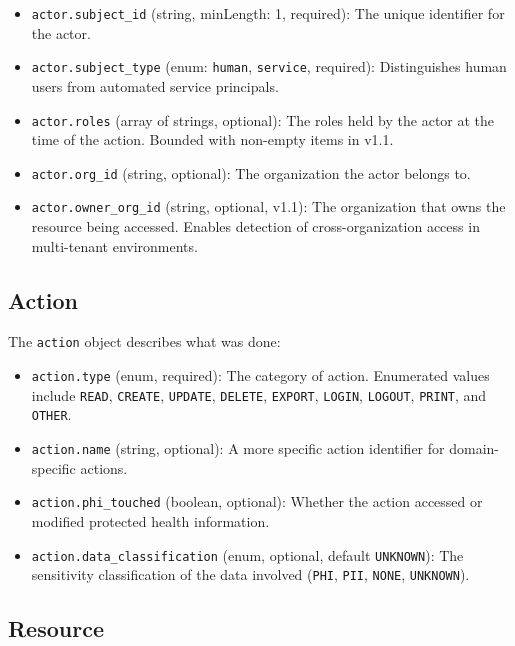 \documentclass[11pt,a4paper]{article}
\begin{document}
\begin{itemize}
    \item \texttt{actor.subject\_id} (string, minLength: 1, required): The unique identifier for the actor.
    \item \texttt{actor.subject\_type} (enum: \texttt{human}, \texttt{service}, required): Distinguishes human users from automated service principals.
    \item \texttt{actor.roles} (array of strings, optional): The roles held by the actor at the time of the action. Bounded with non-empty items in v1.1.
    \item \texttt{actor.org\_id} (string, optional): The organization the actor belongs to.
    \item \texttt{actor.owner\_org\_id} (string, optional, v1.1): The organization that owns the resource being accessed. Enables detection of cross-organization access in multi-tenant environments.
\end{itemize}

\subsection{Action}

The \texttt{action} object describes what was done:

\begin{itemize}
    \item \texttt{action.type} (enum, required): The category of action. Enumerated values include \texttt{READ}, \texttt{CREATE}, \texttt{UPDATE}, \texttt{DELETE}, \texttt{EXPORT}, \texttt{LOGIN}, \texttt{LOGOUT}, \texttt{PRINT}, and \texttt{OTHER}.
    \item \texttt{action.name} (string, optional): A more specific action identifier for domain-specific actions.
    \item \texttt{action.phi\_touched} (boolean, optional): Whether the action accessed or modified protected health information.
    \item \texttt{action.data\_classification} (enum, optional, default \texttt{UNKNOWN}): The sensitivity classification of the data involved (\texttt{PHI}, \texttt{PII}, \texttt{NONE}, \texttt{UNKNOWN}).
\end{itemize}

\subsection{Resource}
\end{document}
